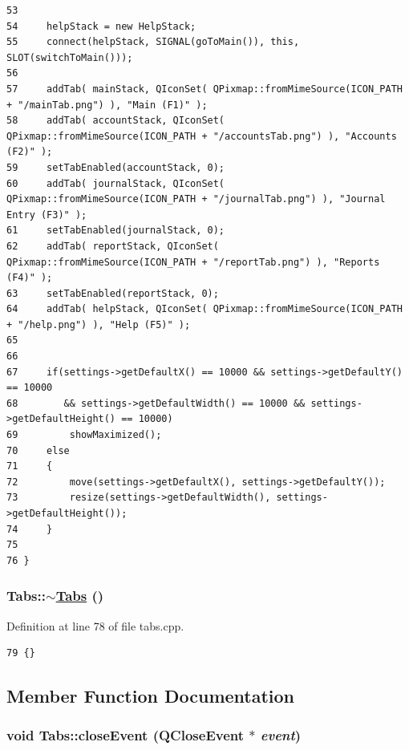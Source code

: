 \begin{verbatim}
53     
54     helpStack = new HelpStack;
55     connect(helpStack, SIGNAL(goToMain()), this, SLOT(switchToMain()));
56     
57     addTab( mainStack, QIconSet( QPixmap::fromMimeSource(ICON_PATH + "/mainTab.png") ), "Main (F1)" );
58     addTab( accountStack, QIconSet( QPixmap::fromMimeSource(ICON_PATH + "/accountsTab.png") ), "Accounts (F2)" );
59     setTabEnabled(accountStack, 0);
60     addTab( journalStack, QIconSet( QPixmap::fromMimeSource(ICON_PATH + "/journalTab.png") ), "Journal Entry (F3)" );
61     setTabEnabled(journalStack, 0);
62     addTab( reportStack, QIconSet( QPixmap::fromMimeSource(ICON_PATH + "/reportTab.png") ), "Reports (F4)" );
63     setTabEnabled(reportStack, 0);
64     addTab( helpStack, QIconSet( QPixmap::fromMimeSource(ICON_PATH + "/help.png") ), "Help (F5)" );
65 
66 
67     if(settings->getDefaultX() == 10000 && settings->getDefaultY() == 10000 
68        && settings->getDefaultWidth() == 10000 && settings->getDefaultHeight() == 10000)
69         showMaximized();
70     else
71     {
72         move(settings->getDefaultX(), settings->getDefaultY());
73         resize(settings->getDefaultWidth(), settings->getDefaultHeight());
74     }
75     
76 }
\end{verbatim}\normalsize 


\hypertarget{classTabs_a1}{
\subsubsection[$\sim$Tabs]{\setlength{\rightskip}{0pt plus 5cm}Tabs::$\sim$\hyperlink{classTabs}{Tabs} ()}}
\label{classTabs_a1}


Definition at line 78 of file tabs.cpp.

\footnotesize\begin{verbatim}79 {}
\end{verbatim}\normalsize 




\subsection{Member Function Documentation}
\hypertarget{classTabs_d1}{
\subsubsection[closeEvent]{\setlength{\rightskip}{0pt plus 5cm}void Tabs::close\-Event (QClose\-Event $\ast$ {\em event})}}
\label{classTabs_d1}


